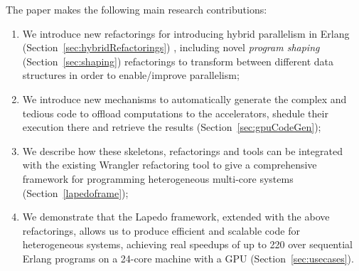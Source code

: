\documentclass[final]{jfp1}
\newcommand{\lapedo}{\xspace{\sc Lapedo}\xspace}
\newcommand{\Lapedo}{\lapedo}
\begin{document}
The paper makes the following main research contributions:
\begin{enumerate}
\item
We introduce new refactorings for introducing hybrid parallelism in Erlang (Section~\ref{sec:hybridRefactorings}) , including novel
\emph{program shaping} (Section~\ref{sec:shaping}) refactorings to transform between different data structures in order to enable/improve parallelism;
\item
We introduce new mechanisms to automatically generate the complex and tedious code to offload computations to the accelerators, shedule their execution there and retrieve the results (Section~\ref{sec:gpuCodeGen});
\item
We describe how these skeletons, refactorings and tools can be integrated with the existing
Wrangler refactoring tool to give a comprehensive framework for programming heterogeneous
multi-core systems (Section~\ref{lapedoframe});
\item
We demonstrate that the \Lapedo{} framework, extended with the above refactorings, allows us to produce efficient and scalable code for heterogeneous systems,
achieving real speedups of up to 220 over sequential Erlang programs on a 24-core machine with a GPU (Section~\ref{sec:usecases}).
\end{enumerate}
\end{document}
